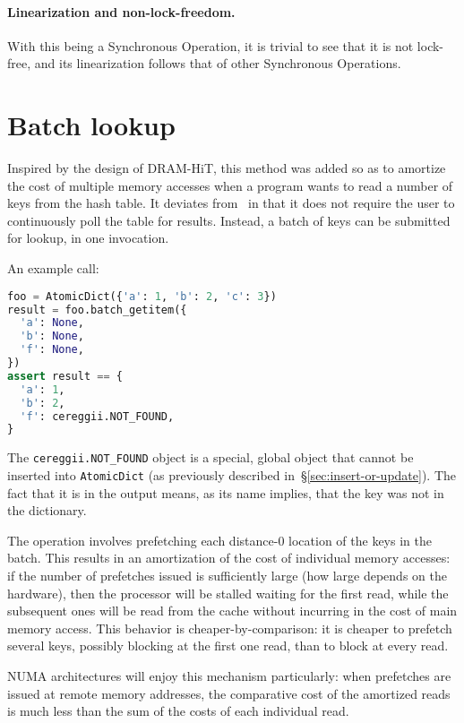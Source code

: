 \paragraph{Linearization and non-lock-freedom.}
With this being a Synchronous Operation, it is trivial to see that it is not lock-free, and its linearization follows that of other Synchronous Operations.

\section{Batch lookup}\label{sec:batch-lookup}

Inspired by the design of DRAM-HiT, this method was added so as to amortize the cost of multiple memory accesses when a program wants to read a number of keys from the hash table.
It deviates from~\cite{dramhit} in that it does not require the user to continuously poll the table for results.
Instead, a batch of keys can be submitted for lookup, in one invocation.

An example call:

\begin{lstlisting}[language=Python,label={lst:batch-lookup-usage}]
foo = AtomicDict({'a': 1, 'b': 2, 'c': 3})
result = foo.batch_getitem({
  'a': None,
  'b': None,
  'f': None,
})
assert result == {
  'a': 1,
  'b': 2,
  'f': cereggii.NOT_FOUND,
}
\end{lstlisting}

The \texttt{cereggii.NOT\_FOUND} object is a special, global object that cannot be inserted into \texttt{AtomicDict} (as previously described in~\S\ref{sec:insert-or-update}).
The fact that it is in the output means, as its name implies, that the key was not in the dictionary.

The operation involves prefetching each distance-0 location of the keys in the batch.
This results in an amortization of the cost of individual memory accesses: if the number of prefetches issued is sufficiently large (how large depends on the hardware), then the processor will be stalled waiting for the first read, while the subsequent ones will be read from the cache without incurring in the cost of main memory access.
This behavior is cheaper-by-comparison: it is cheaper to prefetch several keys, possibly blocking at the first one read, than to block at every read.

NUMA architectures will enjoy this mechanism particularly: when prefetches are issued at remote memory addresses, the comparative cost of the amortized reads is much less than the sum of the costs of each individual read.

